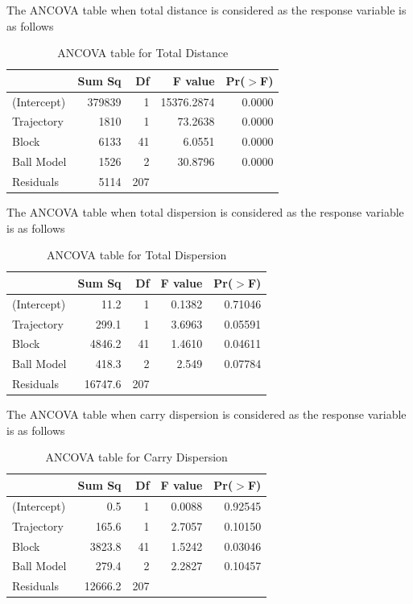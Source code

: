 \documentclass{article}\usepackage[]{graphicx}\usepackage[]{color}
\begin{document}
\newpage
{}

The ANCOVA table when total distance is considered as the response variable is as follows

\begin{table}[ht]
\centering
\begin{tabular}{|l|rrrr|}
  \hline
 & Sum Sq & Df & F value & Pr($>$F) \\ 
  \hline
(Intercept) & 379839 & 1 & 15376.2874 & 0.0000 \\ 
  Trajectory & 1810 & 1 & 73.2638 & 0.0000 \\ 
  Block & 6133 & 41 & 6.0551 & 0.0000 \\ 
  Ball Model & 1526 & 2 & 30.8796 & 0.0000 \\ 
  Residuals & 5114 & 207 &  &  \\ 
   \hline
\end{tabular}
\caption{ANCOVA table for Total Distance}
\end{table}


The ANCOVA table when total dispersion is considered as the response variable is as follows




\begin{table}[ht]
\centering
\begin{tabular}{|l|rrrr|}
  \hline
 & Sum Sq & Df & F value & Pr($>$F) \\ 
  \hline
(Intercept) & 11.2 & 1 & 0.1382 & 0.71046 \\ 
  Trajectory & 299.1 & 1 & 3.6963 & 0.05591 \\ 
  Block & 4846.2 & 41 & 1.4610 & 0.04611 \\ 
  Ball Model & 418.3 & 2 & 2.549 & 0.07784 \\ 
  Residuals & 16747.6 & 207 &  &  \\ 
   \hline
\end{tabular}
\caption{ANCOVA table for Total Dispersion}
\end{table}

The ANCOVA table when carry dispersion is considered as the response variable is as follows

\begin{table}[ht]
\centering
\begin{tabular}{|l|rrrr|}
  \hline
 & Sum Sq & Df & F value & Pr($>$F) \\ 
  \hline
(Intercept) & 0.5 & 1 & 0.0088 & 0.92545 \\ 
  Trajectory & 165.6 & 1 & 2.7057 & 0.10150 \\ 
  Block & 3823.8 & 41 & 1.5242 & 0.03046 \\ 
  Ball Model & 279.4 & 2 & 2.2827 & 0.10457 \\ 
  Residuals & 12666.2 & 207 &  &  \\ 
   \hline
\end{tabular}
\caption{ANCOVA table for Carry Dispersion}
\end{table}
\end{document}
